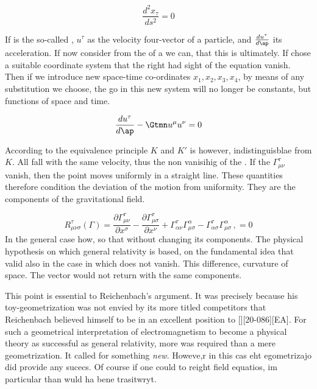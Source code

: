 \begin{equation}\label{eq:geodesicelectro}
\frac{d^{2} x_{\tau}}{d s^{2}} = 0
\end{equation}

If \ap is the so-called , $u^\tau$ as the velocity four-vector of a particle, and $\frac{d {u^\tau}}{d\ap}$ its acceleration. If now consider from the of a we can, that this is ultimately. If chose a suitable coordinate system that the right had sight of the equation vanish. Then if we introduce new space-time co-ordinates $x_{1}, x_{2}, x_{3}, x_{4}$, by means of any substitution we choose, the go in this new system will no longer be constants, but functions of space and time.

\begin{equation*}
\frac{d {u^\tau}}{d\ap} - \Gtmn u^{\mu} u^\nu =0 
\end{equation*}
 
According to the equivalence principle $K$ and $K'$ is however, indistinguisblae from $K$. All fall with the same velocity, thus the non vanisihig of the \gmn. If the $\Gamma_{\mu \nu}^{\tau}$ vanish, then the point moves uniformly in a straight line. These quantities therefore condition the deviation of the motion from uniformity. They are the components of the gravitational field.


\begin{equation}\label{eq:riemanntensorgamma}
R_{\mu \nu \sigma}^{\tau}(\Gamma)=\frac{\partial \Gamma_{\mu \nu}^{\tau}}{\partial x^{\sigma}}-\frac{\partial \Gamma_{\mu \sigma}^{\tau}}{\partial x^{\nu}}+\Gamma_{\alpha \nu}^{\tau} \Gamma_{\mu \sigma}^{\alpha}-\Gamma_{\alpha \sigma}^{\tau} \Gamma_{\mu\sigma}^{\alpha}\,, = 0
\end{equation}
%
In the general case how, so that without changing its components. The physical hypothesis on which general relativity is based, on the fundamental idea that valid also in the case in which does not vanish. This difference, curvature of space. The vector would not return with the same components.

This point is essential to Reichenbach's argument. It was precisely because his toy-geometrization was not envied by its more titled competitors that Reichenbach believed himself to be in an excellent position to [][20-086][EA]. For such a geometrical interpretation of electromagnetism to become a physical theory as successful as general relativity, more was required than a mere geometrization. It called for something \emph{new}. Howeve,r in this cas eht egometrizajo did provide any sucecs. Of course if one could to reight field equatios, im particular than wuld ha bene trasitwryt.


